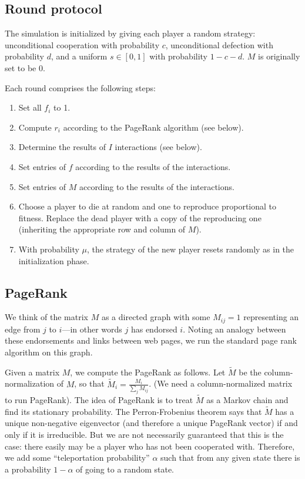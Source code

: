 \documentclass{amsart}
\begin{document}
\subsection{Round protocol}
The simulation is initialized by giving each player a random strategy:
unconditional cooperation with probability $c$, unconditional
defection with probability $d$, and a uniform $s \in [0,1]$ with
probability $1 - c- d$. $M$ is originally set to be $0$.

Each round comprises the following steps:

\begin{enumerate}
\item Set all $f_i$ to 1.
\item Compute $r_i$ according to the PageRank algorithm (see below).
\item Determine the results of $I$ interactions (see below).
\item Set entries of $f$ according to the results of the interactions.
\item Set entries of $M$ according to the results of the interactions.
\item Choose a player to die at random and one to reproduce
  proportional to fitness. Replace the dead player with a copy of the
  reproducing one (inheriting the appropriate row and column of $M$).
\item With probability $\mu$, the strategy of the new player resets
  randomly as in the initialization phase.
\end{enumerate}

\subsection{PageRank}
\newcommand{\tM}{\tilde M} We think of the matrix $M$ as a directed
graph with some $M_{ij} = 1$ representing an edge from $j$ to $i$---in
other words $j$ has endorsed $i$. Noting an analogy between these
endorsements and links between web pages, we run the standard page
rank algorithm on this graph.

Given a matrix $M$, we compute the PageRank as follows. Let $\tM$ be
the column-normalization of $M$, so that $\tM_i = \frac{M_i}{\sum_j
  M_{ij}}$. (We need a column-normalized matrix to run PageRank). The
idea of PageRank is to treat $\tM$ as a Markov chain and find its
stationary probability. The Perron-Frobenius theorem says that $\tM$
has a unique non-negative eigenvector (and therefore a unique PageRank
vector) if and only if it is irreducible. But we are not necessarily
guaranteed that this is the case: there easily may be a player who has
not been cooperated with. Therefore, we add some ``teleportation
probability'' $\alpha$ such that from any given state there is a
probability $1-\alpha$ of going to a random state.
\end{document}
